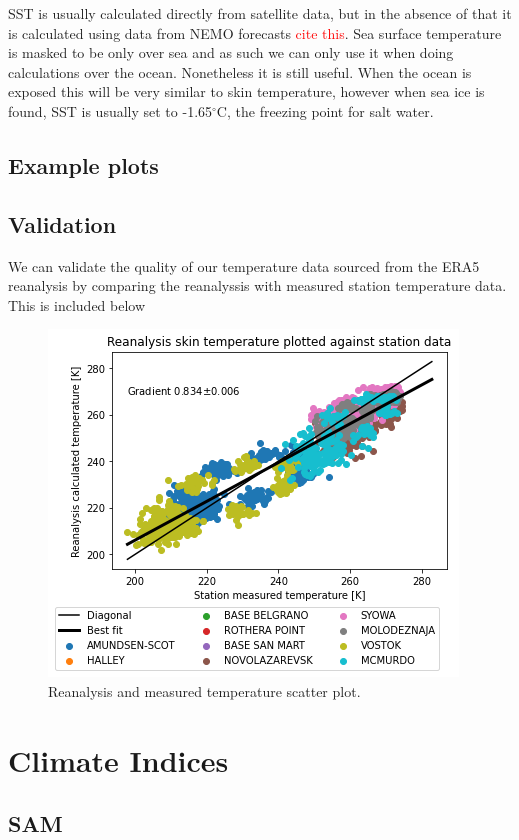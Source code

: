 \documentclass[../main.tex]{subfiles}
\begin{document}
SST is usually calculated directly from satellite data, but in the absence of that it is calculated using data from NEMO forecasts 
\textcolor{red}{cite this}.
Sea surface temperature is masked to be only over sea and as such we can only use it when doing calculations over the ocean. Nonetheless it is still useful.
When the ocean is exposed this will be very similar to skin temperature, however when sea ice is found, SST is usually set to -1.65$^\circ$C, the freezing point for salt water. 

\subsection{Example plots}


\subsection{Validation}
We can validate the quality of our temperature data sourced from the ERA5 reanalysis by comparing the reanalyssis with measured station temperature data. This is included below
\begin{figure}[h!]
    \centering
    \includegraphics{images/week7/lres/temperature_station_verification_scatter}
    \caption{Reanalysis and measured temperature scatter plot.}
    \label{fig:temperature_station_verification_scatter}
\end{figure}



\section{Climate Indices}
\subsection*{SAM}
\end{document}
